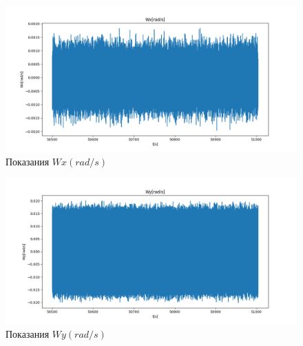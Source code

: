 \documentclass[a4paper,14pt]{article}
\theoremstyle{plain} %
\theoremstyle{definition} %
\theoremstyle{remark} %
\begin{document}
{\begin{figure}[h!]
    \centering
    \includegraphics[width=0.99\linewidth]{Wx.png}
    \caption{Показания $Wx(rad/s)$}
    \label{fig:wx}
\end{figure}

\begin{figure}[h!]
    \centering
    \includegraphics[width=0.99\linewidth]{Wy.png}
    \caption{Показания $Wy(rad/s)$}
    \label{fig:wy}
\end{figure}

}
\end{document}
